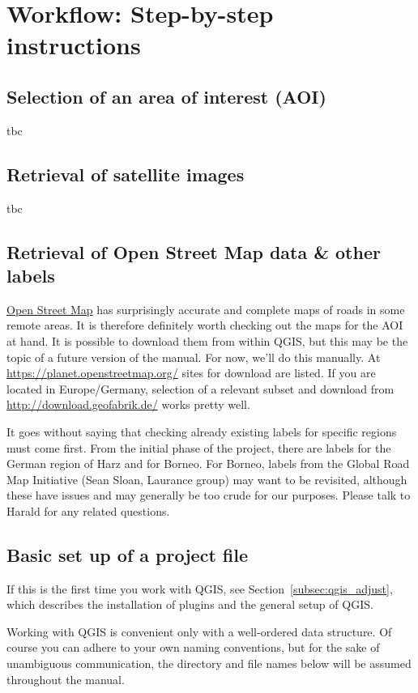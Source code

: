 \documentclass[12pt,a4paper]{scrartcl}
\begin{document}
\section{Workflow: Step-by-step instructions}
\subsection{Selection of an area of interest (AOI)}
tbc

\subsection{Retrieval of satellite images}
tbc

\subsection{Retrieval of Open Street Map data \& other labels}
\href{https://www.openstreetmap.org/}{Open Street Map} has surprisingly accurate and complete maps of roads in some remote areas. It is therefore definitely worth checking out the maps for the AOI at hand. It is possible to download them from within QGIS, but this may be the topic of a future version of the manual. For now, we'll do this manually. At \url{https://planet.openstreetmap.org/} sites for download are listed. If you are located in Europe/Germany, selection of a relevant subset and download from \url{http://download.geofabrik.de/} works pretty well.

It goes without saying that checking already existing labels for specific regions must come first. From the initial phase of the project, there are labels for the German region of Harz and for Borneo. For Borneo, labels from the Global Road Map Initiative (Sean Sloan, Laurance group) may want to be revisited, although these have issues and may generally be too crude for our purposes. Please talk to Harald for any related questions.

\subsection{Basic set up of a project file}
\label{step2}
If this is the first time you work with QGIS, see Section~\ref{subsec:qgis_adjust}, which describes the installation of plugins and the general setup of QGIS.

Working with QGIS is convenient only with a well-ordered data structure. Of course you can adhere to your own naming conventions, but for the sake of unambiguous communication, the directory and file names below will be assumed throughout the manual. 
\end{document}
